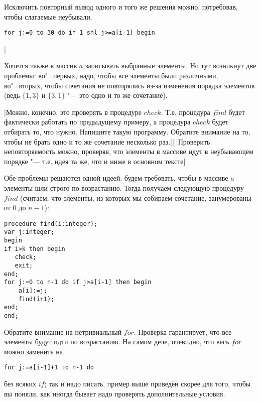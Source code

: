 Исключить повторный вывод одного и того же решения можно, потребовав, чтобы слагаемые неубывали.
\begin{codesampleo}\begin{verbatim}
for j:=0 to 30 do if 1 shl j>=a[i-1] begin
\end{verbatim}\end{codesampleo}
|



 Хочется также в массив $a$ 
записывать выбранные элементы. Но тут возникнут две  
проблемы: во"=первых, надо, чтобы все элементы были различными, во"=вторых, чтобы 
сочетания не повторялись из-за изменения порядка элементов (ведь $\{1,3\}$ и $\{3,1\}$ 
"--- это одно и то же сочетание).

\task|Можно, конечно, это проверять в процедуре $check$. Т.е. процедура $find$ 
будет фактически работать по предыдущему примеру, а процедура $check$ будет отбирать то, 
что нужно. Напишите такую программу. Обратите внимание на то, чтобы не 
брать одно и то же сочетание несколько раз.||||Проверить неповторяемость можно, проверяя, что 
элементы в массиве идут в неубывающем порядке "--- т.е. идея та же, что и ниже в основном тексте|

Обе проблемы решаются одной идеей: будем требовать, чтобы в массиве $a$ элементы 
шли строго по возрастанию. Тогда получаем следующую процедуру $find$ (считаем, что 
элементы, из которых мы собираем сочетание, занумерованы от $0$ до $n-1$): 

\begin{codesampleo}\begin{verbatim}
procedure find(i:integer);
var j:integer;
begin
if i>k then begin
   check;
   exit;
end;
for j:=0 to n-1 do if j>a[i-1] then begin
    a[i]:=j;
    find(i+1);
end;
end;
\end{verbatim}\end{codesampleo}


Обратите внимание на нетривиальный $for$. Проверка гарантирует, что все элементы 
будут идти по возрастанию. На самом деле, очевидно, что весь $for$ можно заменить на 

\begin{codesampleo}\begin{verbatim}
for j:=a[i-1]+1 to n-1 do
\end{verbatim}\end{codesampleo}
без всяких $if$; так и надо писать, пример выше приведён скорее для того, чтобы 
вы поняли, как иногда бывает надо проверять дополнительные условия.

